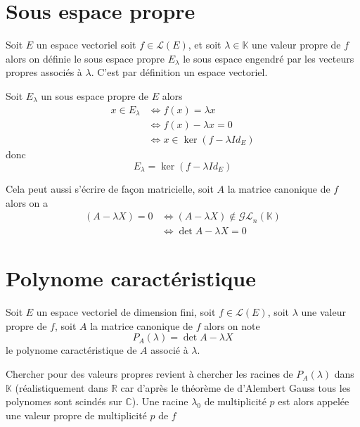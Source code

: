 \documentclass[11pt,colorlinks]{book}
\theoremstyle{mytheoremstyle}
\theoremstyle{mytheoremstyle}
\theoremstyle{mytheoremstyle}
\theoremstyle{mytheoremstyle}
\theoremstyle{mytheoremstyle}
\theoremstyle{mytheoremstyle}
\theoremstyle{mytheoremstyle}
\theoremstyle{mytheoremstyle}
\theoremstyle{myproblemstyle}
\def\mbb#1{\mathbb{#1}}
\def\mfc#1{\mathcal{#1}}
\def\bC{\mbb{C}}
\def\bR{\mbb{R}}
\def\bK{\mbb{K}}
\def\ev{espace vectoriel }
\begin{document}
\section{Sous espace propre}
\begin{definition}
  Soit $E$ un espace vectoriel soit $f \in \mfc{L}(E)$, et soit $\lambda \in \bK$ une valeur propre de $f$ alors on définie le sous espace propre
  $E_\lambda$ le sous espace engendré par les vecteurs propres associés à $\lambda$. C'est par définition un espace vectoriel.
\end{definition}
\begin{prop}[Caractérisation]
  Soit $E_{\lambda}$ un sous espace propre de $E$ alors 
  \begin{align*}
    x \in E_{\lambda} &\Leftrightarrow f(x) = \lambda x \\ 
    &\Leftrightarrow f(x) - \lambda x = 0 \\ 
    &\Leftrightarrow x \in \ker (f - \lambda Id_E)
  \end{align*}
  donc 
  \begin{equation*}
    E_\lambda = \ker (f - \lambda Id_E)
  \end{equation*}
\end{prop}
\begin{rmq}
  Cela peut aussi s'écrire de façon matricielle, soit $A$ la matrice canonique de $f$ alors on a 
  \begin{align*}
    (A-\lambda X) = 0 &\Leftrightarrow (A-\lambda X) \not\in \mfc{GL}_n(\bK) \\
    &\Leftrightarrow \det A-\lambda X = 0
  \end{align*}
\end{rmq}
\section{Polynome caractéristique}
\begin{definition}
  Soit $E$ un \ev de dimension fini, soit $f \in \mfc{L}(E)$, soit $\lambda$ une valeur propre de $f$, soit $A$ la matrice canonique de $f$
  alors on note 
  \begin{equation*}
    P_A(\lambda) = \det A - \lambda X
  \end{equation*}
  le polynome caractéristique de $A$ associé à $\lambda$.

  
  Chercher pour des valeurs propres revient à chercher les racines de $P_A(\lambda)$ dans $\bK$ (réalistiquement dans $\bR$ car d'après le théorème de 
  d'Alembert Gauss tous les polynomes sont scindés sur $\bC$). Une racine $\lambda_0$ de multiplicité $p$ est alors appelée une valeur propre de multiplicité $p$ de $f$
\end{definition}
\end{document}
